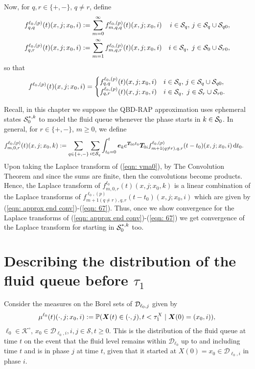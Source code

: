 Now, for \(q,r\in\{+,-\},\, q\neq r\), define  
\begin{align*}
	f^{\ell_0,(p)}_{q,q}(t)(x,j;x_0,i)  &:= \sum_{m=0}^\infty f^{\ell_0,(p)}_{m,q,q}(t)(x,j;x_0,i)  & i\in\mathcal{S}_q,\,j\in\mathcal{S}_q\cup\mathcal{S}_{q0},
	\\ f^{\ell_0,(p)}_{q,r}(t)(x,j;x_0,i)  &:= \sum_{m=1}^\infty f^{\ell_0,(p)}_{m,q,r}(t)(x,j;x_0,i)  & i\in\mathcal S_q,\,\,j\in\mathcal S_{0}\cup\mathcal{S}_{r0},
\end{align*}
so that 
\begin{align}
	f^{\ell_0,(p)}(t)(x,j;x_0,i)  = \begin{cases}
		 f^{\ell_0,(p)}_{q,q}(t)(x,j;x_0,i)  & i\in\mathcal{S}_q,\,j\in\mathcal{S}_q\cup\mathcal{S}_{q0},
	\\    f^{\ell_0,(p)}_{q,r}(t)(x,j;x_0,i)  & i\in\mathcal S_q,\,\,j\in\mathcal S_{r}\cup\mathcal{S}_{r0}.
	\end{cases}\label{eqn:ghghghghggg}
\end{align}

Recall, in this chapter we suppose the QBD-RAP approximation uses ephemeral states \(\mathcal{S}_0^{*,k}\) to model the fluid queue whenever the phase starts in \(k\in\mathcal{S}_0\). In general, for \(r\in\{+,-\}\), \(m\geq 0\), we define
\begin{align}
	f_{m,0,r}^{\ell_0,(p)}(t)(x,j;x_0,k)  
	&:= \sum_{q\in\{+,-\}}\sum_{i\in\mathcal{S}_q}\int_{t_0=0}^t \boldsymbol e_ke^{\boldsymbol T_{00}t_0} \boldsymbol T_{0i} f_{m+1(q\neq r),q,r}^{\ell_0,(p)}(t-t_0)(x,j;x_0,i)\, \mathrm{d} t_0 . \label{eqn: vma0}
\end{align}
Upon taking the Laplace transform of (\ref{eqn: vma0}), by The Convolution Theorem and since the sums are finite, then the convolutions become products. Hence, the Laplace transform of \(f_{m,0,r}^{\ell_0}(t)(x,j;x_0,k)\) is a linear combination of the Laplace transforms of \(f_{m+1(q\neq r),q,r}^{\ell_0,(p)}(t-t_0)(x,j;x_0,i)\) which are given by (\ref{eqn: approx end conv})-(\ref{eqn: 67}). Thus, once we show convergence for the Laplace transforms of (\ref{eqn: approx end conv})-(\ref{eqn: 67}) we get convergence of the Laplace transform for starting in \(\mathcal{S}_0^{*,k}\) too. 


\section{Describing the distribution of the fluid queue before \(\tau_1\)}\label{sec: no change}
Consider the measures on the Borel sets of \(\mathcal{D}_{\ell_0,j}\) given by
\begin{align}\label{eqn: sojourn}
	\mu^{\ell_0}(t)(\cdot,j; x_0,i) := \mathbb P(\boldsymbol X(t)\in (\cdot ,j), t<\tau_1^X \mid \boldsymbol X(0) = (x_0, i)),
\end{align}
\(\ell_0\in\mathcal K^\circ\), \(x_0 \in\mathcal D_{\ell_0,i}, i,j\in\mathcal S, t \geq 0. \)
This is the distribution of the fluid queue at time \(t\) on the event that the fluid level remains within \(\mathcal D_{\ell_0}\) up to and including time \(t\) and is in phase \(j\) at time \(t\), given that it started at \(X(0)=x_0\in\mathcal D_{\ell_0,i}\) in phase \(i\). 


